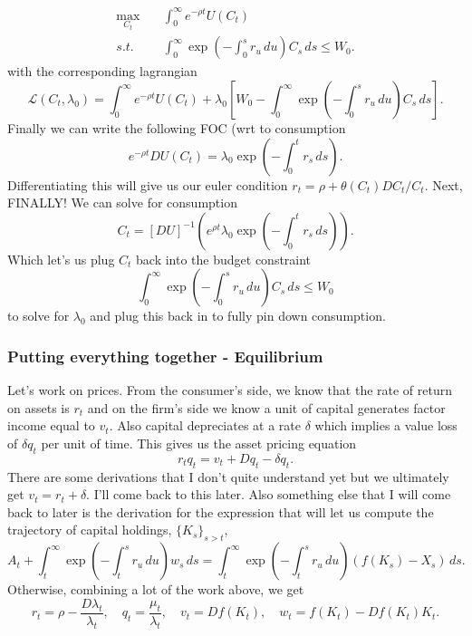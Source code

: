 \documentclass[11pt,english]{article}
\begin{document}
\begin{align*}
\max_{C_t}&\quad \int_0^\infty e^{-\rho t}U(C_t)\\
s.t. &\quad \int_0^\infty \exp\left(-\int_0^s r_u\,du\right)C_s\,ds \leq W_0.
\end{align*} with the corresponding lagrangian $$\mathcal{L}(C_t, \lambda_0) = \int_0^\infty e^{-\rho t}U(C_t) + \lambda_0\left[W_0 - \int_0^\infty \exp\left(-\int_0^s r_u\,du\right)C_s\,ds\right].$$Finally we can write the following FOC (wrt to consumption $$e^{-\rho t}DU(C_t) = \lambda_0\exp\left(-\int_0^tr_s\,ds\right).$$
Differentiating this will give us our euler condition $r_t = \rho + \theta(C_t)DC_t/C_t$. Next, FINALLY! We can solve for consumption $$C_t = [DU]^{-1}\left(e^{\rho t}\lambda_0\exp\left(-\int_0^tr_s\,ds\right)\right).$$ Which let's us plug $C_t$ back into the budget constraint $$\int_0^\infty \exp\left(-\int_0^s r_u\,du\right)C_s\,ds \leq W_0$$ to solve for $\lambda_0$ and plug this back in to fully pin down consumption.

\subsubsection{Putting everything together - Equilibrium}
Let's work on prices. From the consumer's side, we know that the rate of return on assets is $r_t$ and on the firm's side we know a unit of capital generates factor income equal to $v_t$. Also capital depreciates at a rate $\delta$ which implies a value loss of $\delta q_t$ per unit of time. This gives us the asset pricing equation
$$r_tq_t = v_t + Dq_t - \delta q_t.$$ There are some derivations that I don't quite understand yet but we ultimately get $v_t = r_t + \delta$. I'll come back to this later. Also something else that I will come back to later is the derivation for the expression that will let us compute the trajectory of capital holdings, $\{K_s\}_{s > t}$, $$A_t + \int_t^\infty \exp\left(-\int_t^s r_u\,du\right)w_s\,ds = \int_t^\infty \exp\left(-\int_t^s r_u\,du\right)(f(K_s) - X_s)\,ds.$$Otherwise, combining a lot of the work above, we get $$r_t = \rho - \frac{D\lambda_t}{\lambda_t},\quad q_t = \frac{\mu_t}{\lambda_t},\quad v_t = Df(K_t),\quad w_t = f(K_t) - Df(K_t)K_t.$$
\end{document}
